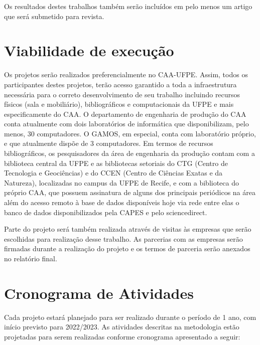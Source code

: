 \documentclass[11pt,letterpaper,twocolumn]{article}
\begin{document}
Os resultados destes trabalhos também serão incluídos em pelo menos um artigo que será submetido para revista.

\section{Viabilidade de execução}

Os projetos serão realizados preferencialmente no CAA-UFPE. Assim, todos os participantes destes projetos, terão acesso garantido a toda a infraestrutura necessária para o correto desenvolvimento de seu trabalho incluindo recursos físicos (sala e mobiliário), bibliográficos e computacionais da UFPE e mais especificamente do CAA. O departamento de engenharia de produção do CAA conta atualmente com dois laboratórios de informática que disponibilizam, pelo menos, 30 computadores. O GAMOS, em especial, conta com laboratório próprio, e que atualmente dispõe de 3 computadores. Em termos de recursos bibliográficos, os pesquisadores da área de engenharia da produção contam com a biblioteca central da UFPE e as bibliotecas setoriais do CTG (Centro de Tecnologia e Geociências) e do CCEN (Centro de Ciências Exatas e da Natureza), localizadas no campus da UFPE de Recife, e com a biblioteca do próprio CAA, que possuem assinatura de alguns dos principais periódicos na área além do acesso remoto à base de dados disponíveis hoje via rede entre elas o banco de dados disponibilizados pela CAPES e pelo sciencedirect. 

Parte do projeto será também realizada através de visitas às empresas que serão escolhidas para realização desse trabalho. As parcerias com as empresas serão firmadas durante a realização do projeto e os termos de parceria serão anexados no relatório final.

\section{Cronograma de Atividades}

Cada projeto estará planejado para ser realizado durante o período de 1 ano, com início previsto para 2022/2023. As atividades descritas na metodologia estão projetadas para serem realizadas conforme cronograma apresentado a seguir:
\end{document}
